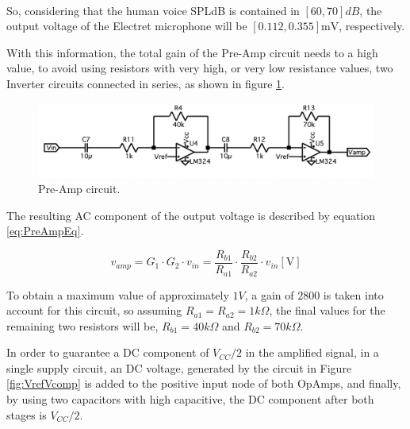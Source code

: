 So, considering that the human voice SPLdB is contained in $[60, 70]dB$\textsuperscript{\cite{micro-sens}}, the output voltage of the Electret microphone will be $[0.112, 0.355]\si{\milli\volt}$, respectively.

With this information, the total gain of the Pre-Amp circuit needs to a high value, to avoid using resistors with very high, or very low resistance values, two Inverter circuits connected in series, as shown in figure \ref{fig:PreAmp}.

\begin{figure}[H]
    \centering
    \includegraphics*[scale = 0.5]{Images/PreAmp circuit.png}
    \caption{Pre-Amp circuit.}
    \label{fig:PreAmp}
\end{figure}

The resulting AC component of the output voltage is described by equation \ref{eq:PreAmpEq}.

\begin{equation}
    v_{amp} = G_1 \cdot G_2 \cdot v_{in} = \frac{R_{b1}}{R_{a1}} \cdot \frac{R_{b2}}{R_{a2}} \cdot v_{in} [\si{\volt}]
    \label{eq:PreAmpEq}
\end{equation}

To obtain a maximum value of approximately $1V$, a gain of $2800$ is taken into account for this circuit, so assuming $R_{a1} = R_{a2} = 1k\Omega$, the final values for the remaining two resistors will be, $R_{b1} = 40k\Omega$ and $R_{b2} = 70k\Omega$.

In order to guarantee a DC component of $V_{CC}/2$ in the amplified signal, in a single supply circuit, an DC voltage, generated by the circuit in Figure \ref{fig:VrefVcomp} is added to the positive input node of both OpAmps, and finally, by using two capacitors with high capacitive, the DC component after both stages is $V_{CC}/2$.

